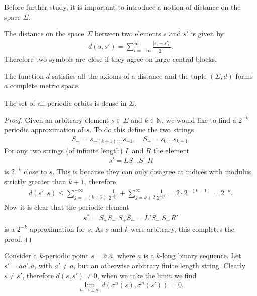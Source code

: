 Before further study, it is important to introduce a notion of distance on the space $\Sigma$.
\begin{definition}
	The distance on the space $\Sigma$ between two elements $s$ and $s'$ is given by
	\begin{align}
		d(s,s') = \sum_{i=-\infty }^{\infty } \frac{|s_i - s'_i |}{2^{|i|}}.
	\end{align}
Therefore two symbols are close if they agree on large central blocks.	
\end{definition}
\begin{remark}[]
	The function $d$ satisfies all the axioms of a distance and the tuple $(\Sigma, d) $ forms a complete metric space. 
\end{remark}

\begin{proposition}
The set of all periodic orbits is dense in $\Sigma$.	
\end{proposition}
\begin{proof}
	Given an arbitrary element $s\in\Sigma$ and $k \in \mathbb{N}$, we would like to find a $2^{-k}$ periodic approximation of $s$. To do this define the two strings
	\begin{align}
		S_{-} = s_{-(k+1)}\ldots s_{-1}, \quad S_{+} = s_0 \ldots s_{k+1}.
	\end{align}
	For any two strings (of infinite length) $L$ and $R$ the element
	 \begin{align}
		s' = L S_{-}\bm{.} S_{+}R
	\end{align}
	is $2^{-k}$ close to $s$. This is because they can only disagree at indices with modulus strictly greater than $k+1$, therefore
	\begin{align}
		d(s',s) \leq \sum_{j=-(k+2)}^{-\infty }\frac{1}{2^{-|j|}} + \sum_{j=k+2}^{\infty } \frac{1}{2^{-|j|}} = 2\cdot 2^{-(k+1)} = 2^{-k}. 
	\end{align}
Now it is clear that the periodic element
\begin{align}
	s^{*} = \overline{S_{+}S_{-}} \bm{.} \overline{S_{+}S_{-}} = L' S_{-}\bm{.} S_{+}R'
\end{align}
is a $2^{-k}$ approximation for $s$. As $s$ and $k$ were arbitrary, this completes the proof.
\end{proof}
\begin{proposition}[]
	Consider a $k$-periodic point $s=\overline{a}\bm{.} \overline{a}$, where $a$ is a $k$-long binary sequence. Let $s' = \overline{a}a'\bm{.} \overline{a}$, with $a' \neq a$, but an otherwise arbitrary finite length string. Clearly $s \neq s'$, therefore $d(s,s') \neq 0$, when we take the limit we find
\begin{align}
	\lim_{n\to \pm \infty }	d(\sigma^{n}(s), \sigma^{n}(s')) = 0.
\end{align}
\end{proposition}


